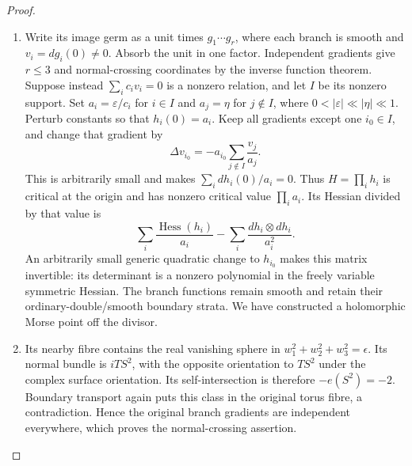 \begin{proof}
\begin{enumerate}[label={$\langle1\rangle$\arabic*.},leftmargin=*]
\item Write its image germ as a unit times $g_1\cdots g_r$, where
each branch is smooth and $v_i=dg_i(0)\ne0$. Absorb the
unit in one factor. Independent gradients give $r\leq3$
and normal-crossing coordinates by the inverse function
theorem. Suppose instead $\sum_i c_iv_i=0$ is a nonzero
relation, and let $I$ be its nonzero support. Set
$a_i=\varepsilon/c_i$ for $i\in I$ and $a_j=\eta$ for
$j\notin I$, where $0<|\varepsilon|\ll|\eta|\ll1$.
Perturb constants so that $h_i(0)=a_i$. Keep all gradients
except one $i_0\in I$, and change that gradient by
\[
 \Delta v_{i_0}=-a_{i_0}\sum_{j\notin I}\frac{v_j}{a_j}.
\]
This is arbitrarily small and makes $\sum_i dh_i(0)/a_i=0$.
Thus $H=\prod_i h_i$ is critical at the origin and has
nonzero critical value $\prod_i a_i$. Its Hessian divided
by that value is
\[
 \sum_i\frac{\operatorname{Hess}(h_i)}{a_i}
 -\sum_i\frac{dh_i\otimes dh_i}{a_i^2}.
\]
An arbitrarily small generic quadratic change to $h_{i_0}$
makes this matrix invertible: its determinant is a nonzero
polynomial in the freely variable symmetric Hessian.
The branch functions remain smooth and retain their
ordinary-double/smooth boundary strata. We have constructed
a holomorphic Morse point off the divisor.

\item Its nearby fibre contains the real vanishing sphere in
$w_1^2+w_2^2+w_3^2=\epsilon$. Its normal bundle is
$iTS^2$, with the opposite orientation to $TS^2$ under the
complex surface orientation. Its self-intersection is
therefore $-e(S^2)=-2$. Boundary transport again puts this
class in the original torus fibre, a contradiction. Hence
the original branch gradients are independent everywhere,
which proves the normal-crossing assertion.

\end{enumerate}
\end{proof}